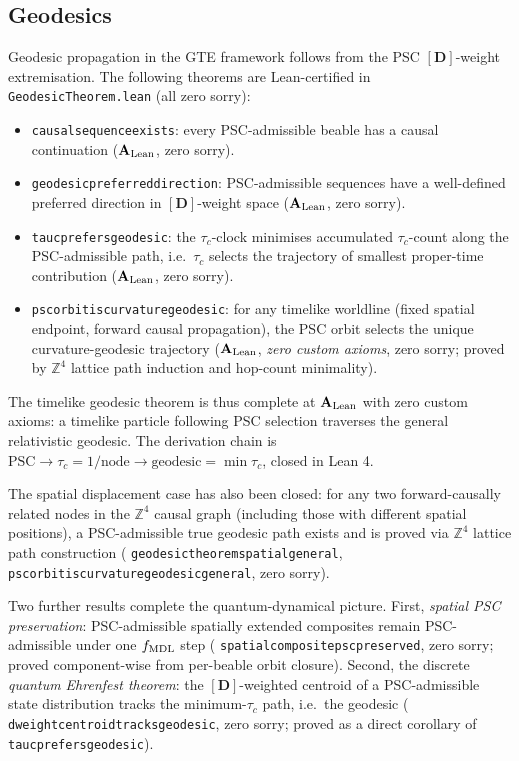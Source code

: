 \documentclass[11pt]{article}
\theoremstyle{remark}
\newcommand{\PSC}{\text{PSC}}
\newcommand{\lean}[1]{%
  \penalty-100
  \begingroup\def\_{\textunderscore\allowbreak}\texttt{#1}\endgroup}
\newcommand{\fmdl}{f_{\rm MDL}}
\newcommand{\CatAL}{\ensuremath{\textbf{A}_{\rm Lean}}}
\begin{document}

\subsection{Geodesics}
\label{sec:geodesics}

Geodesic propagation in the GTE framework follows from the PSC
$[\mathbf{D}]$-weight extremisation.  The following theorems are
Lean-certified in \lean{GeodesicTheorem.lean} (all zero sorry):
\begin{itemize}[noitemsep]
\item \lean{causal\_sequence\_exists}: every PSC-admissible beable has a causal
  continuation ($\CatAL$, zero sorry).
\item \lean{geodesic\_preferred\_direction}: PSC-admissible sequences have a
  well-defined preferred direction in $[\mathbf{D}]$-weight space ($\CatAL$, zero sorry).
\item \lean{tau\_c\_prefers\_geodesic}: the $\tau_c$-clock minimises accumulated
  $\tau_c$-count along the PSC-admissible path, i.e.\ $\tau_c$ selects the
  trajectory of smallest proper-time contribution ($\CatAL$, zero sorry).
\item \lean{psc\_orbit\_is\_curvature\_geodesic}: for any timelike worldline
  (fixed spatial endpoint, forward causal propagation), the PSC orbit
  selects the unique curvature-geodesic trajectory ($\CatAL$, \emph{zero
  custom axioms}, zero sorry; proved by $\mathbb{Z}^4$ lattice path
  induction and hop-count minimality).
\end{itemize}
The timelike geodesic theorem is thus complete at $\CatAL$ with zero custom
axioms: a timelike particle following PSC selection traverses the general
relativistic geodesic.  The derivation chain is
$\PSC\to\tau_c = 1/\text{node}\to\text{geodesic} = \min\tau_c$, closed
in Lean 4.

The spatial displacement case has also been closed: for any two forward-causally
related nodes in the $\mathbb{Z}^4$ causal graph (including those with different
spatial positions), a PSC-admissible true geodesic path exists and is proved
via $\mathbb{Z}^4$ lattice path construction (\lean{geodesic\_theorem\_spatial\_general},
\lean{psc\_orbit\_is\_curvature\_geodesic\_general}, zero sorry).

Two further results complete the quantum-dynamical picture.  First,
\emph{spatial PSC preservation}: PSC-admissible spatially extended composites
remain PSC-admissible under one $\fmdl$ step
(\lean{spatial\_composite\_psc\_preserved}, zero sorry; proved component-wise
from per-beable orbit closure).  Second, the discrete \emph{quantum Ehrenfest
theorem}: the $[\mathbf{D}]$-weighted centroid of a PSC-admissible state
distribution tracks the minimum-$\tau_c$ path, i.e.\ the geodesic
(\lean{dweight\_centroid\_tracks\_geodesic}, zero sorry; proved as a direct
corollary of \lean{tau\_c\_prefers\_geodesic}).
\end{document}
